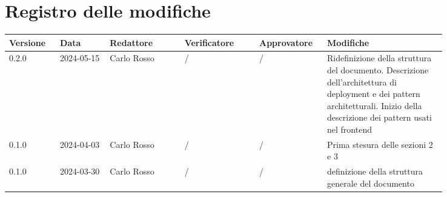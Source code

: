 \section*{Registro delle modifiche}
 {
  \renewcommand{\arraystretch}{1.5}
  \scriptsize
  \begin{longtable}{p{0.10\linewidth}p{0.10\linewidth}p{0.15\linewidth}p{0.15\linewidth}p{0.10\linewidth}p{0.24\linewidth}}
	  \textbf{Versione} & \textbf{Data} & \textbf{Redattore} & \textbf{Verificatore} & \textbf{Approvatore} & \textbf{Modifiche}                                 \\
	  \toprule
	  0.2.0             & 2024-05-15    & Carlo Rosso        & /
	  & /                    & Ridefinizione della struttura del documento.
	  Descrizione dell'architettura di deployment e dei pattern architetturali.
	  Inizio della descrizione dei pattern usati nel frontend \\
	  \hline
	  0.1.0             & 2024-04-03    & Carlo Rosso        & /                     & /                    & Prima stesura delle sezioni 2 e 3                  \\
	  \hline
	  0.1.0             & 2024-03-30    & Carlo Rosso        & /                     & /                    & definizione della struttura generale del documento \\
	  \bottomrule
  \end{longtable}
 }
